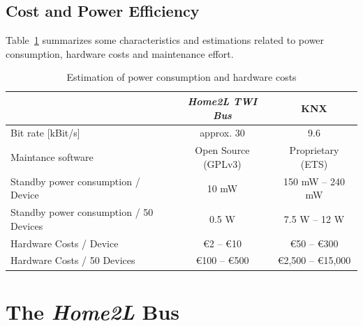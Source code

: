 \documentclass[12pt,english,parskip=half,headheight=19pt]{scrreprt}
\begin{document}
\subsection*{Cost and Power Efficiency}

Table~\ref{tab:brownies-costs} summarizes some characteristics and estimations related to power consumption, hardware costs and maintenance effort.

\begin{table}[ht]
  \centering
  \renewcommand{\arraystretch}{1.4}
  \begin{tabular}{l||c|c}
    & \textit{Home2L TWI Bus} & KNX \\
    \hline \hline
    Bit rate [kBit/s]
      & approx. 30            & 9.6 \\
    \hline Maintance software
      & Open Source (GPLv3) & Proprietary (ETS) \\
    \hline Standby power consumption / Device \footnotemark[1]
      & 10 mW      & 150 mW -- 240 mW \\
    \hline Standby power consumption / 50 Devices
      & 0.5 W      & 7.5 W -- 12 W \\
    \hline Hardware Costs / Device \footnotemark[2]
      & €2 -- €10     & €50 -- €300 \\
    \hline Hardware Costs / 50 Devices
      & €100 -- €500  & €2,500 -- €15,000
  \end{tabular}
  \caption[l]{Estimation of power consumption and hardware costs}
  \label{tab:brownies-costs}
\end{table}



\clearpage   %





\section{The \textit{Home2L} Bus}
\label{sec:brownies-bus}
\end{document}
